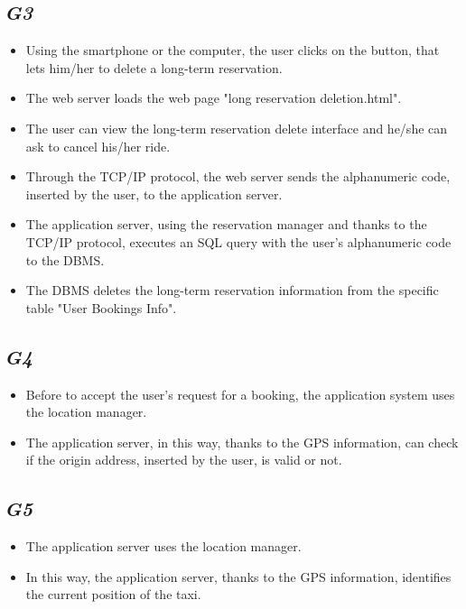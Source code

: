	\subsection {\emph{G3}}
		\begin{itemize}
			\item Using the smartphone or the computer, the user clicks on the button, that lets him/her to delete a long-term reservation.
			\item The web server loads the web page "long reservation deletion.html".
			\item The user can view the long-term reservation delete interface and he/she can ask to cancel his/her ride.
			\item Through the TCP/IP protocol, the web server sends the alphanumeric code, inserted by the user, to the application server.
			\item The application server, using the reservation manager and thanks to the TCP/IP protocol, executes an SQL query with the user's alphanumeric code to the DBMS.
			\item The DBMS deletes the long-term reservation information from the specific table "User Bookings Info".
		\end{itemize}
	\subsection {\emph{G4}}
		\begin{itemize}
			\item Before to accept the user's request for a booking, the application system uses the location manager.
			\item The application server, in this way, thanks to the GPS information, can check if the origin address, inserted by the user, is valid or not.
		\end{itemize}
	\subsection {\emph{G5}}
		\begin{itemize}
			\item The application server uses the location manager.
			\item In this way, the application server, thanks to the GPS information, identifies the current position of the taxi.
		\end{itemize}
